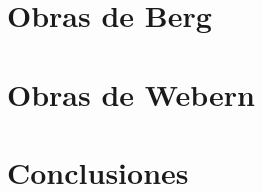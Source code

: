 %   	
%   	
   	
    \section{Obras de Berg}
    \section{Obras de Webern}
    \section{Conclusiones}